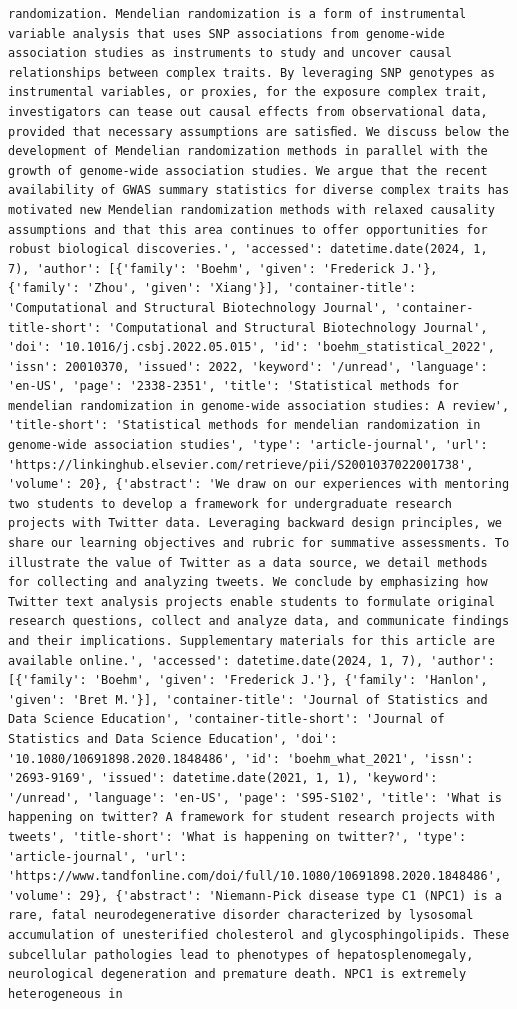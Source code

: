 \documentclass[
  12pt,
]
{article}
\begin{document}
\begin{verbatim}
randomization. Mendelian randomization is a form of instrumental variable analysis that uses SNP associations from genome-wide association studies as instruments to study and uncover causal relationships between complex traits. By leveraging SNP genotypes as instrumental variables, or proxies, for the exposure complex trait, investigators can tease out causal effects from observational data, provided that necessary assumptions are satisﬁed. We discuss below the development of Mendelian randomization methods in parallel with the growth of genome-wide association studies. We argue that the recent availability of GWAS summary statistics for diverse complex traits has motivated new Mendelian randomization methods with relaxed causality assumptions and that this area continues to offer opportunities for robust biological discoveries.', 'accessed': datetime.date(2024, 1, 7), 'author': [{'family': 'Boehm', 'given': 'Frederick J.'}, {'family': 'Zhou', 'given': 'Xiang'}], 'container-title': 'Computational and Structural Biotechnology Journal', 'container-title-short': 'Computational and Structural Biotechnology Journal', 'doi': '10.1016/j.csbj.2022.05.015', 'id': 'boehm_statistical_2022', 'issn': 20010370, 'issued': 2022, 'keyword': '/unread', 'language': 'en-US', 'page': '2338-2351', 'title': 'Statistical methods for mendelian randomization in genome-wide association studies: A review', 'title-short': 'Statistical methods for mendelian randomization in genome-wide association studies', 'type': 'article-journal', 'url': 'https://linkinghub.elsevier.com/retrieve/pii/S2001037022001738', 'volume': 20}, {'abstract': 'We draw on our experiences with mentoring two students to develop a framework for undergraduate research projects with Twitter data. Leveraging backward design principles, we share our learning objectives and rubric for summative assessments. To illustrate the value of Twitter as a data source, we detail methods for collecting and analyzing tweets. We conclude by emphasizing how Twitter text analysis projects enable students to formulate original research questions, collect and analyze data, and communicate findings and their implications. Supplementary materials for this article are available online.', 'accessed': datetime.date(2024, 1, 7), 'author': [{'family': 'Boehm', 'given': 'Frederick J.'}, {'family': 'Hanlon', 'given': 'Bret M.'}], 'container-title': 'Journal of Statistics and Data Science Education', 'container-title-short': 'Journal of Statistics and Data Science Education', 'doi': '10.1080/10691898.2020.1848486', 'id': 'boehm_what_2021', 'issn': '2693-9169', 'issued': datetime.date(2021, 1, 1), 'keyword': '/unread', 'language': 'en-US', 'page': 'S95-S102', 'title': 'What is happening on twitter? A framework for student research projects with tweets', 'title-short': 'What is happening on twitter?', 'type': 'article-journal', 'url': 'https://www.tandfonline.com/doi/full/10.1080/10691898.2020.1848486', 'volume': 29}, {'abstract': 'Niemann-Pick disease type C1 (NPC1) is a rare, fatal neurodegenerative disorder characterized by lysosomal accumulation of unesterified cholesterol and glycosphingolipids. These subcellular pathologies lead to phenotypes of hepatosplenomegaly, neurological degeneration and premature death. NPC1 is extremely heterogeneous in 
\end{verbatim}
\end{document}
